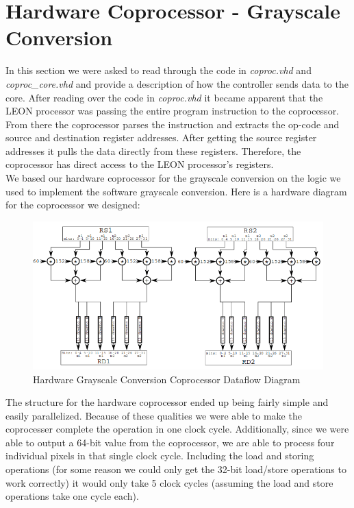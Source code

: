 \documentclass{article}
\begin{document}
\section{Hardware Coprocessor - Grayscale Conversion}
In this section we were asked to read through the code in \textit{coproc.vhd} and \textit{coproc\_core.vhd} and provide a description of how the controller sends data to the core. After reading over the code in \textit{coproc.vhd} it became apparent that the LEON processor was passing the entire program instruction to the coprocessor. From there the coprocessor parses the instruction and extracts the op-code and source and destination register addresses. After getting the source register addresses it pulls the data directly from these registers. Therefore, the coprocessor has direct access to the LEON processor's registers. \\

We based our hardware coprocessor for the grayscale conversion on the logic we used to implement the software grayscale conversion. Here is a hardware diagram for the coprocessor we designed:

	 \begin{figure}[H]
	 	\begin{center}
	 		\includegraphics[scale=0.6]{../part5_files/Grayscale_coprocessor_dataflow.png}
	 		\caption{Hardware Grayscale Conversion Coprocessor Dataflow Diagram}
	 	\end{center}
	 \end{figure}

The structure for the hardware coprocessor ended up being fairly simple and easily parallelized. Because of these qualities we were able to make the coprocesser complete the operation in one clock cycle. Additionally, since we were able to output a 64-bit value from the coprocessor, we are able to process four individual pixels in that single clock cycle. Including the load and storing operations (for some reason we could only get the 32-bit load/store operations to work correctly) it would only take 5 clock cycles (assuming the load and store operations take one cycle each).
\end{document}
